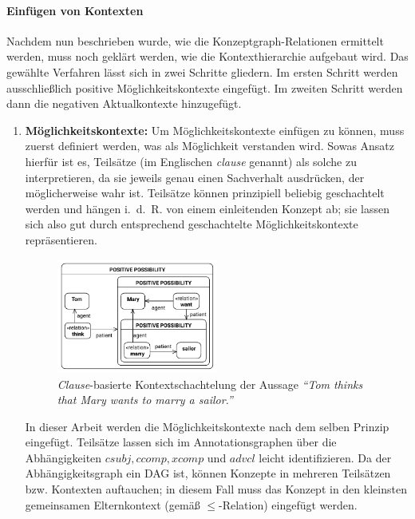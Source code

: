 \paragraph{Einfügen von Kontexten}
Nachdem nun beschrieben wurde, wie die Konzeptgraph-Relationen ermittelt werden, muss noch geklärt werden, wie die Kontexthierarchie aufgebaut wird.
Das gewählte Verfahren lässt sich in zwei Schritte gliedern.
Im ersten Schritt werden ausschließlich positive Möglichkeitskontexte eingefügt.
Im zweiten Schritt werden dann die negativen Aktualkontexte hinzugefügt.
\begin{enumerate}
	\item \textbf{Möglichkeitskontexte:}
		Um Möglichkeitskontexte einfügen zu können, muss zuerst definiert werden, was als Möglichkeit verstanden wird.
		Sowas Ansatz hierfür ist es, Teilsätze (im Englischen \textit{clause} genannt) als solche zu interpretieren, da sie jeweils genau einen Sachverhalt ausdrücken, der möglicherweise wahr ist.
		Teilsätze können prinzipiell beliebig geschachtelt werden und hängen i.~d.~R. von einem einleitenden Konzept ab;
		sie lassen sich also gut durch entsprechend geschachtelte Möglichkeitskontexte repräsentieren.

		\begin{figure}
			\centering
			\includegraphics[width=0.5\textwidth]{gfx/text2kg/contextExtractionGraph1.pdf}
			\caption{\textit{Clause}-basierte Kontextschachtelung der Aussage \textit{``Tom thinks that Mary wants to marry a sailor.''}}\label{fig:text2kg:contextExtractionGraph1} %
		\end{figure}
		In dieser Arbeit werden die Möglichkeitskontexte nach dem selben Prinzip eingefügt.
		Teilsätze lassen sich im Annotationsgraphen über die Abhängigkeiten $csubj, ccomp, xcomp$ und $advcl$ leicht identifizieren.
		Da der Abhängigkeitsgraph ein DAG ist, können Konzepte in mehreren Teilsätzen bzw. Kontexten auftauchen;
		in diesem Fall muss das Konzept in den kleinsten gemeinsamen Elternkontext (gemäß $\leq$-Relation) eingefügt werden.


\end{enumerate}
